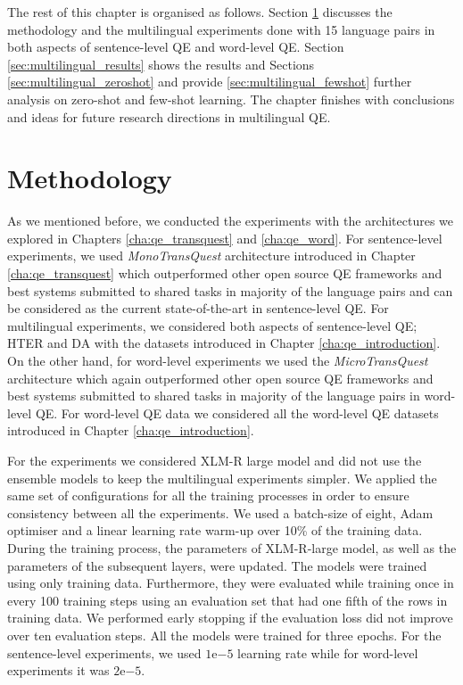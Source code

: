 The rest of this chapter is organised as follows. Section \ref{sec:multilingual_method} discusses the methodology and the multilingual experiments done with 15 language pairs in both aspects of sentence-level QE and word-level QE.  Section \ref{sec:multilingual_results} shows the results and Sections \ref{sec:multilingual_zeroshot} and provide \ref{sec:multilingual_fewshot} further analysis on zero-shot and few-shot learning. The chapter finishes with conclusions and ideas for future research directions in multilingual QE.
 

\section{Methodology}
\label{sec:multilingual_method}
As we mentioned before, we conducted the experiments with the architectures we explored in Chapters \ref{cha:qe_transquest} and \ref{cha:qe_word}. For sentence-level experiments, we used \textit{MonoTransQuest} architecture introduced in Chapter \ref{cha:qe_transquest} which outperformed other open source QE frameworks and best systems submitted to shared tasks in majority of the language pairs and can be considered as the current state-of-the-art in sentence-level QE. For multilingual experiments, we considered both aspects of sentence-level QE; HTER and DA with the datasets introduced in Chapter \ref{cha:qe_introduction}. On the other hand, for word-level experiments we used  the \textit{MicroTransQuest} architecture which again outperformed other open source QE frameworks and best systems submitted to shared tasks in majority of the language pairs in word-level QE. For word-level QE data we considered all the word-level QE datasets introduced in Chapter \ref{cha:qe_introduction}.

For the experiments we considered XLM-R large model and did not use the ensemble models to keep the multilingual experiments simpler. We applied the same set of configurations for all the training processes in order to ensure consistency between all the experiments. We used a batch-size of eight, Adam optimiser and a linear learning rate warm-up over 10\% of the training data. During the training process, the parameters of XLM-R-large model, as well as the parameters of the subsequent layers, were updated. The models were trained using only training data. Furthermore, they were evaluated while training once in every 100 training steps using an evaluation set that had one fifth of the rows in training data. We performed early stopping if the evaluation loss did not improve over ten evaluation steps. All the models were trained for three epochs. For the sentence-level experiments, we used  $1\mathrm{e}{-5}$ learning rate while for word-level experiments it was $2\mathrm{e}{-5}$. 



